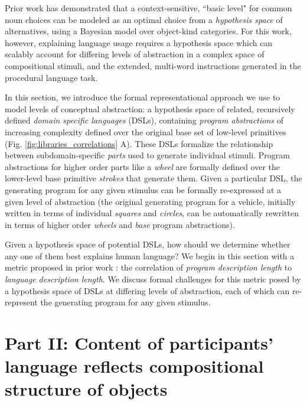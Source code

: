 Prior work  has demonstrated that a context-sensitive, ``basic level" for common noun choices can be modeled as an optimal choice from a \textit{hypothesis space} of alternatives, using a Bayesian model over object-kind categories. For this work, however, explaining language usage requires a hypothesis space which can scalably account for differing levels of abstraction in a complex space of compositional stimuli, and the extended, multi-word instructions generated in the procedural language task.

In this section, we introduce the formal representational approach we use to model levels of conceptual abstraction: a hypothesis space of related, recursively defined \textit{domain specific languages} (DSLs), containing \textit{program abstractions} of increasing complexity defined over the original base set of low-level primitives (Fig. \ref{fig:libraries_correlations} A). These DSLs formalize the relationship between subdomain-specific \textit{parts} used to generate individual stimuli. Program abstractions for higher order parts like a \textit{wheel} are formally defined over the lower-level base primitive \textit{strokes} that generate them. Given a particular DSL, the generating program for any given stimulus can be formally re-expressed at a given level of abstraction (the original generating program for a vehicle, initially written in terms of individual \textit{squares} and \textit{circles}, can be automatically rewritten in terms of higher order \textit{wheels} and \textit{base} program abstractions).

Given a hypothesis space of potential DSLs, how should we determine whether any one of them best explains human language? We begin in this section with a metric proposed in prior work \cite{sun2021seeing}: the correlation of \textit{program description length} to \textit{language description length}. We discuss formal challenges for this metric posed by a hypothesis space of DSLs at differing levels of abstraction, each of which can re-represent the generating program for any given stimulus.

\section{Part II: Content of participants' language reflects compositional structure of objects}\label{sec-part-ii}



